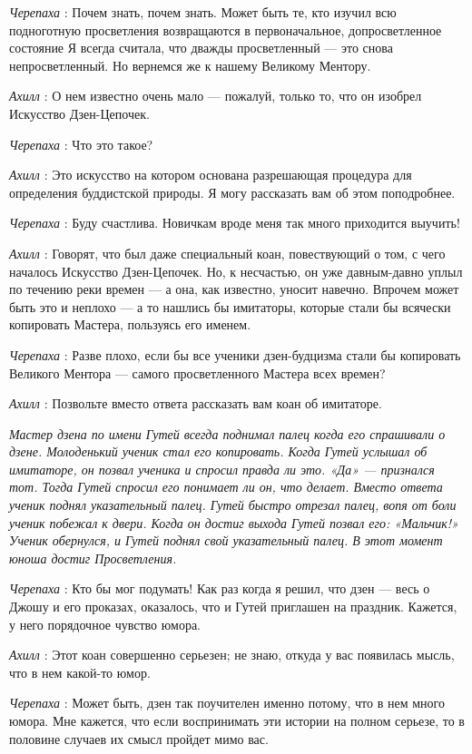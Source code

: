 \emph{Черепаха} : Почем знать, почем знать. Может быть те, кто изучил всю подноготную просветления возвращаются в первоначальное, допросветленное состояние Я всегда считала, что дважды просветленный --- это снова непросветленный. Но вернемся же к нашему Великому Ментору.

\emph{Ахилл} : О нем известно очень мало --- пожалуй, только то, что он изобрел Искусство Дзен-Цепочек.

\emph{Черепаха} : Что это такое?

\emph{Ахилл} : Это искусство на котором основана разрешающая процедура для определения буддистской природы. Я могу рассказать вам об этом поподробнее.

\emph{Черепаха} : Буду счастлива. Новичкам вроде меня так много приходится выучить!

\emph{Ахилл} : Говорят, что был даже специальный коан, повествующий о том, с чего началось Искусство Дзен-Цепочек. Но, к несчастью, он уже давным-давно уплыл по течению реки времен --- а она, как известно, уносит навечно. Впрочем может быть это и неплохо --- а то нашлись бы имитаторы, которые стали бы всячески копировать Мастера, пользуясь его именем.

\emph{Черепаха} : Разве плохо, если бы все ученики дзен-будцизма стали бы копировать Великого Ментора --- самого просветленного Мастера всех времен?

\emph{Ахилл} : Позвольте вместо ответа рассказать вам коан об имитаторе.

\emph{Мастер дзена по имени Гутей всегда поднимал палец когда его спрашивали о дзене. Молоденький ученик стал его копировать. Когда Гутей услышал об имитаторе, он позвал ученика и спросил правда ли это. «Да» --- признался тот. Тогда Гутей спросил его понимает ли он, что делает. Вместо ответа ученик поднял указательный палец. Гутей быстро отрезал палец, вопя от боли ученик побежал к двери. Когда он достиг выхода Гутей позвал его: «Мальчик!» Ученик обернулся, и Гутей поднял свой указательный палец. В этот момент юноша достиг Просветления.}

\emph{Черепаха} : Кто бы мог подумать! Как раз когда я решил, что дзен --- весь о Джошу и его проказах, оказалось, что и Гутей приглашен на праздник. Кажется, у него порядочное чувство юмора.

\emph{Ахилл} : Этот коан совершенно серьезен; не знаю, откуда у вас появилась мысль, что в нем какой-то юмор.

\emph{Черепаха} : Может быть, дзен так поучителен именно потому, что в нем много юмора. Мне кажется, что если воспринимать эти истории на полном серьезе, то в половине случаев их смысл пройдет мимо вас.

